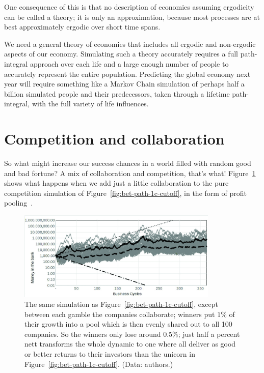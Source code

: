 One consequence of this is that no description of economies assuming ergodicity can be called a theory; it is only an approximation, because most processes are at best approximately ergodic over short time spans.


We need a general theory of economies  that includes all ergodic and non-ergodic aspects of our economy. Simulating such a theory accurately requires a full path\hyp{}integral approach over each life and a large enough number of people to accurately represent the entire population. Predicting the global economy next year will require something like a Markov Chain simulation of perhaps half a billion simulated people and their predecessors, taken through a lifetime path-integral, with the full variety of life influences. 
\section{Competition and collaboration}
\label{section:non-ergodic}
So what might increase our success chances in a world filled with random good and bad fortune? A mix of collaboration and competition, that’s what! Figure~\ref{fig:bet-path-1p-sharing} shows what happens when we add just a little collaboration to the pure competition simulation of Figure~\ref{fig:bet-path-1c-cutoff}, in the form of profit pooling~\cite{Lucky}.


\begin{figure}
\centering
\includegraphics[width=0.85\textwidth]{./Images/ecosystem-PrintReady}
\caption[Collaboration shifts from losing to gaining.]{The same simulation as Figure~\ref{fig:bet-path-1c-cutoff}, except between each gamble the companies collaborate; winners put $1\%$ of their growth into a pool which is then evenly shared out to all 100 companies. So the winners only lose around $0.5\%$; just half a percent nett transforms the whole dynamic to one where all deliver as good or better returns to their investors than the unicorn in Figure~\ref{fig:bet-path-1c-cutoff}. (Data: authors.)}
\label{fig:bet-path-1p-sharing}
\end{figure}


